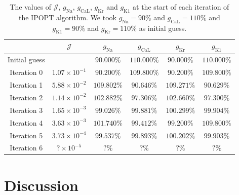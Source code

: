 \documentclass{article}
\begin{document}
\begin{table}
\begin{center}
  \begin{tabular}{c || c c c c c }
    &  $\mathcal{J}$ & $g_{\mathrm{Na}}$ & $g_{\mathrm{CaL}}$ & $g_{\mathrm{Kr}}$ & $g_{\mathrm{K1}}$ \\ 
\hline
Initial guess & 
&   $90.000 \%$ & $110.000 \%$ &   $90.000 \%$ & $110.000 \%$  \\
Iteration 0   & $1.07 \times 10^{-1}$  &   $90.200 \%$ & $109.800 \%$ &   $90.200 \%$ & $109.800 \%$  \\
Iteration 1   & $5.88 \times 10^{-2}$  &   $109.802 \%$ & $90.646 \%$ &   $109.271 \%$ & $90.629 \%$  \\
Iteration 2   & $1.14 \times 10^{-2}$  &   $102.882 \%$ & $97.306 \%$ &   $102.660 \%$ & $97.300 \%$  \\
Iteration 3   & $1.65 \times 10^{-3}$  &   $99.026 \%$ & $99.881 \%$ &   $100.299 \%$ & $99.904 \%$  \\
Iteration 4   & $3.63 \times 10^{-3}$  &   $101.740 \%$ & $99.412 \%$ &   $99.200 \%$ & $109.800 \%$   \\
Iteration 5   & $3.73 \times 10^{-4}$  &   $99.537 \%$ & $99.893 \%$ &   $100.202 \%$ & $99.903 \%$  \\
Iteration 6   & $? \times 10^{-5}$  &   $? \%$ & $? \%$ &   $? \%$ & $? \%$  \\
  \end{tabular}  %
\end{center}
\caption{The values of $\mathcal{J}$, $g_{\mathrm{Na}}$, $g_{\mathrm{CaL}}$, $g_{\mathrm{Kr}}$ and $g_{\mathrm{K1}}$ at the start of each iteration of the IPOPT algorithm. We took $g_{\mathrm{Na}}=90\%$ and $g_{\mathrm{CaL}}=110\%$ and $g_{\mathrm{K1}}=90\%$ and $g_{\mathrm{Kr}}=110\%$ as initial guess.}
\label{table:2}
\end{table}
\section{Discussion} \label{Discussion}
\end{document}
